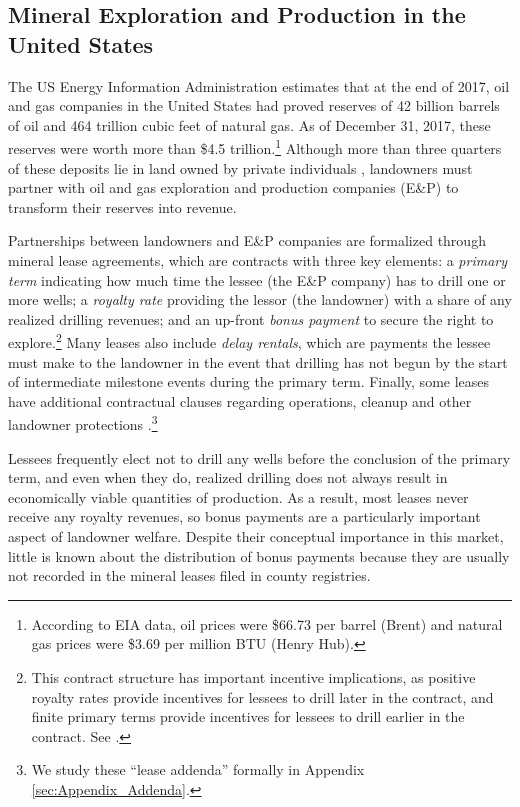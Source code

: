 \subsection{Mineral Exploration and Production in the United States \label{sec:MineralBackground}}
The US Energy Information Administration estimates that at the end of 2017, oil and gas companies in the United States had proved reserves of 42 billion barrels of oil and 464 trillion cubic feet of natural gas. As of December 31, 2017, these reserves were worth more than \$4.5 trillion.\footnote{According to EIA data, oil prices were \$66.73 per barrel (Brent) and natural gas prices were \$3.69 per million BTU (Henry Hub).} Although more than three quarters of these deposits lie in land owned by private individuals \citep{fitzgerald_us_2016}, landowners must partner with oil and gas exploration and production companies (E\&P) to transform their reserves into revenue. 

Partnerships between landowners and E\&P companies are formalized through mineral lease agreements, which are contracts with three key elements: a \textit{primary term} indicating how much time the lessee (the E\&P company) has to drill one or more wells; a \textit{royalty rate} providing the lessor (the landowner) with a share of any realized drilling revenues; and an up-front \textit{bonus payment} to secure the right to explore.\footnote{This contract structure has important incentive implications, as positive royalty rates provide incentives for lessees to drill later in the contract, and finite primary terms provide incentives for lessees to drill earlier in the contract.  See \citet{herrnstadt}.} Many leases also include \textit{delay rentals}, which are payments the lessee must make to the landowner in the event that drilling has not begun by the start of intermediate milestone events during the primary term. Finally, some leases have additional contractual clauses regarding operations, cleanup and other landowner protections \citep{vissing_one--many_2017}.\footnote{We study these ``lease addenda'' formally in Appendix \ref{sec:Appendix_Addenda}.} 

Lessees frequently elect not to drill any wells before the conclusion of the primary term, and even when they do, realized drilling does not always result in economically viable quantities of production. As a result, most leases never receive any royalty revenues, so bonus payments are a particularly important aspect of landowner welfare. Despite their conceptual importance in this market, little is known about the distribution of bonus payments because they are usually not recorded in the mineral leases filed in county registries. 

